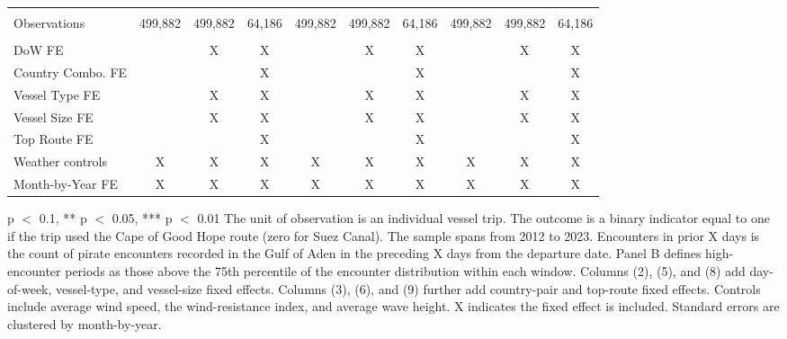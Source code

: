 \begin{table}
\begin{adjustbox}{width = .9\textwidth}
\begin{threeparttable}
\begin{tabular}[t]{lccccccccc}
 &  &  &  &  &  &  &  &  \vphantom{1} & \\
Observations & 499,882 & 499,882 & 64,186 & 499,882 & 499,882 & 64,186 & 499,882 & 499,882 & 64,186\\
 &  &  &  &  &  &  &  &  & \\
DoW FE &  & X & X &  & X & X &  & X & X\\
Country Combo. FE &  &  & X &  &  & X &  &  & X\\
Vessel Type FE &  & X & X &  & X & X &  & X & X\\
Vessel Size FE &  & X & X &  & X & X &  & X & X\\
Top Route FE &  &  & X &  &  & X &  &  & X\\
Weather controls & X & X & X & X & X & X & X & X & X\\
Month-by-Year FE & X & X & X & X & X & X & X & X & X\\
\bottomrule
\end{tabular}
\begin{tablenotes}
\item \scriptsize * p $<$ 0.1, ** p $<$ 0.05, *** p $<$ 0.01 The unit of observation is an individual vessel trip. The outcome is a binary indicator equal to one if the trip used the Cape of Good Hope route (zero for Suez Canal). The sample spans from 2012 to 2023. Encounters in prior X days is the count of pirate encounters recorded in the Gulf of Aden in the preceding X days from the departure date. Panel B defines high-encounter periods as those above the 75th percentile of the encounter distribution within each window. Columns (2), (5), and (8) add day-of-week, vessel-type, and vessel-size fixed effects. Columns (3), (6), and (9) further add country-pair and top-route fixed effects. Controls include average wind speed, the wind-resistance index, and average wave height. X indicates the fixed effect is included. Standard errors are clustered by month-by-year.
\end{tablenotes}
\end{threeparttable}
\end{adjustbox}
\end{table}
